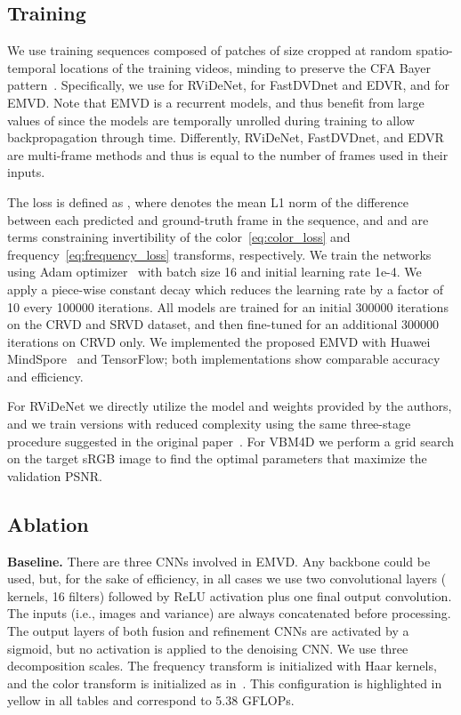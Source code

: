 \documentclass[final]{cvpr}
\begin{document}
    \subsection{Training}
    \label{section:training}
    
    We use training sequences composed of  patches of size  cropped at random spatio-temporal locations of the training videos, minding to preserve the CFA Bayer pattern~\cite{liu2019bayer}. Specifically, we use  for RViDeNet,  for FastDVDnet and EDVR, and  for EMVD. Note that EMVD is a recurrent models, and thus benefit from large values of  since the models are temporally unrolled during training to allow backpropagation through time. Differently, RViDeNet, FastDVDnet, and EDVR are multi-frame methods and thus  is equal to the number of frames used in their inputs.
    
    The loss is defined as , where  denotes the mean L1 norm of the difference between each predicted  and ground-truth  frame in the sequence, and  and  are terms constraining invertibility of the color~\eqref{eq:color_loss} and frequency~\eqref{eq:frequency_loss} transforms, respectively. We train the networks using Adam optimizer~\cite{kingma2014adam} with batch size 16 and initial learning rate 1e-4. We apply a piece-wise constant decay which reduces the learning rate by a factor of 10 every 100000 iterations. All models are trained for an initial 300000 iterations on the CRVD and SRVD dataset, and then fine-tuned for an additional 300000 iterations on CRVD only. We implemented the proposed EMVD with Huawei MindSpore~\cite{mindspore} and TensorFlow; both implementations show comparable accuracy and efficiency.

    For RViDeNet we directly utilize the model and weights provided by the authors, and we train versions with reduced complexity using the same three-stage procedure suggested in the original paper~\cite{yue2020supervised}. For VBM4D we perform a grid search on the target sRGB image to find the optimal parameters that maximize the validation PSNR.
    
    
    \subsection{Ablation}
    \label{section:ablation}
    
    \textbf{Baseline.} There are three CNNs involved in EMVD. Any backbone could be used, but, for the sake of efficiency, in all cases we use two convolutional layers ( kernels, 16 filters) followed by ReLU activation plus one final output convolution. The inputs (i.e., images and variance) are always concatenated before processing. The output layers of both fusion and refinement CNNs are activated by a sigmoid, but no activation is applied to the denoising CNN. We use three decomposition scales. The frequency transform is initialized with Haar kernels, and the color transform is initialized as in~\cite{buades2020cfa}. This configuration is highlighted in yellow in all tables and correspond to 5.38 GFLOPs.
    
\end{document}
